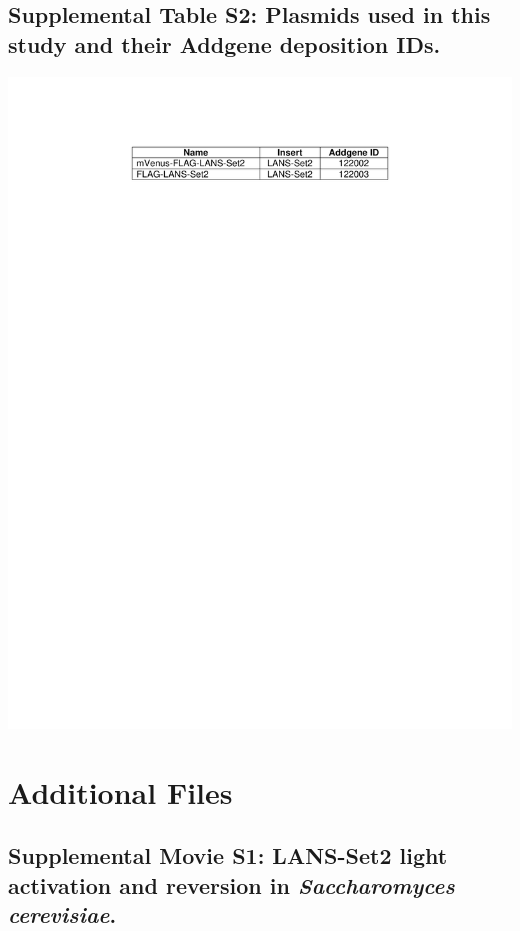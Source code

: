 \documentclass[11pt]{biorxiv}
\begin{document}
\subsection{Supplemental Table S2: Plasmids used in this study and their Addgene deposition IDs.}
\begin{table}[ht!]
\center
\includegraphics[width=\textwidth, trim={0in 9in 0in 1in}, clip]{tables/Supplemental_Table2.pdf}
\end{table}
 
\clearpage

\section{Additional Files}

\subsection{Supplemental Movie S1: LANS-Set2 light activation and reversion in \emph{Saccharomyces cerevisiae}.}
\end{document}
